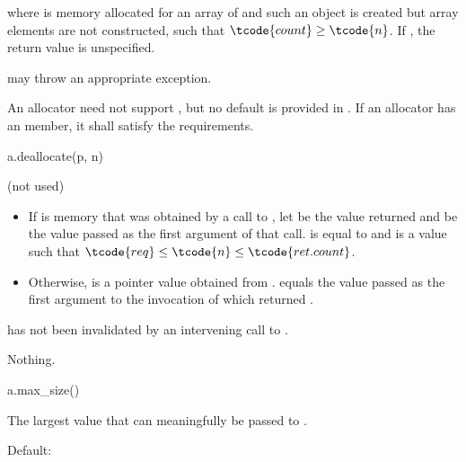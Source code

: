 \begin{itemdescr}
\pnum
\result
{}

\pnum
\returns
{}
where  is memory allocated for an array of  
and such an object is created but array elements are not constructed,
such that $\tcode{count} \geq \tcode{n}$.
If , the return value is unspecified.

\pnum
\throws
{} may throw an appropriate exception.

\pnum
\remarks
An allocator need not support ,
but no default is provided in .
If an allocator has an  member,
it shall satisfy the requirements.
\end{itemdescr}

\begin{itemdecl}
a.deallocate(p, n)
\end{itemdecl}

\begin{itemdescr}
\pnum
\result
(not used)

\pnum
\expects
\begin{itemize}
\item
If  is memory
that was obtained by a call to ,
let  be the value returned and
 be the value passed as the first argument of that call.
 is equal to  and
 is a value such that
$\tcode{req} \leq \tcode{n} \leq \tcode{ret.count}$.
\item
Otherwise,  is a pointer value obtained from .
 equals the value passed as the first argument
to the invocation of  which returned .
\end{itemize}
 has not been invalidated by
an intervening call to .

\pnum
\throws
Nothing.
\end{itemdescr}

\begin{itemdecl}
a.max_size()
\end{itemdecl}

\begin{itemdescr}
\pnum
\result
{}

\pnum
\returns
The largest value that can meaningfully be passed to .

\pnum
\remarks
Default:
\end{itemdescr}

